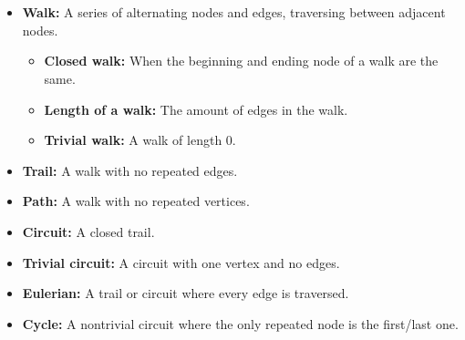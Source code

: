 \documentclass[a4paper,12pt]{book}
\begin{document}
\begin{intro}{\ }
\begin{itemize}
\begin{center}
                \end{center}
            \end{itemize}

        \end{intro}

		\newpage
					
        \begin{intro}{\ }
            \begin{itemize}
                \item   \textbf{Walk:}	 A series of alternating
                		nodes and edges, traversing between adjacent nodes.
                    \begin{itemize}
                        \item   \textbf{Closed walk:} When the beginning
	                        and ending node of a walk are the same.
						\item  \textbf{Length of a walk:} The amount
							of edges in the walk.
						\item \textbf{Trivial walk:} A walk of length 0.
                    \end{itemize}
                    
                \item   \textbf{Trail:}	A walk with no repeated edges.
                \item   \textbf{Path:} A walk with no repeated vertices.
                \item   \textbf{Circuit:} A closed trail.
                \item   \textbf{Trivial circuit:} A circuit with one vertex and no edges.
                \item   \textbf{Eulerian:} A trail or circuit where every edge is traversed.
                \item   \textbf{Cycle:} A nontrivial circuit where the only repeated node is the first/last one.
            \end{itemize}

        \end{intro}
\end{document}
